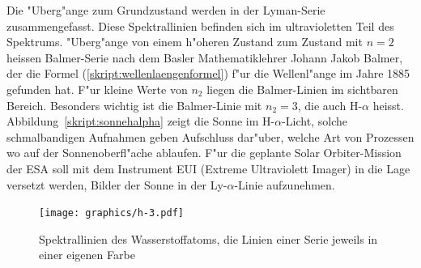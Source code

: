 Die "Uberg"ange zum Grundzustand werden in der Lyman-Serie zusammengefasst.
Diese Spektrallinien befinden sich im ultravioletten Teil des Spektrums.
"Uberg"ange von einem h"oheren Zustand zum Zustand mit $n=2$ 
heissen Balmer-Serie nach dem Basler Mathematiklehrer Johann Jakob Balmer,
der die Formel (\ref{skript:wellenlaengenformel}) f"ur die Wellenl"ange 
im Jahre 1885 gefunden hat.
F"ur kleine Werte von $n_2$ liegen die Balmer-Linien im sichtbaren Bereich.
Besonders wichtig ist die Balmer-Linie mit $n_2=3$, die auch H-$\alpha$
heisst.
Abbildung~\ref{skript:sonnehalpha} zeigt die Sonne im H-$\alpha$-Licht,
solche schmalbandigen Aufnahmen geben Aufschluss dar"uber, welche Art von
Prozessen wo auf der Sonnenoberfl"ache ablaufen.
F"ur die geplante Solar Orbiter-Mission der ESA soll mit dem Instrument
EUI (Extreme Ultraviolett Imager) in die Lage versetzt werden, Bilder
der Sonne in der Ly-$\alpha$-Linie aufzunehmen.

\begin{figure}
\centering
\texttt{[image: graphics/h-3.pdf]}
\caption{Spektrallinien des Wasserstoffatoms, die Linien einer Serie jeweils
in einer eigenen Farbe
\label{skript:hspektrallinien}}
\end{figure}


